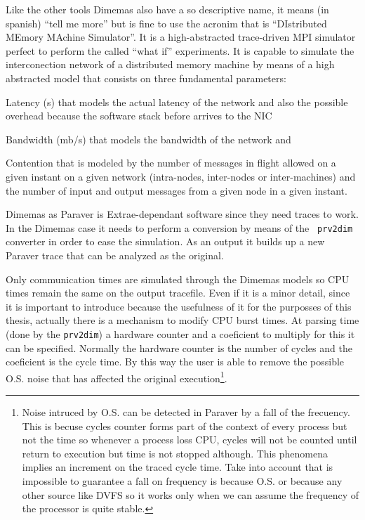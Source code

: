 Like the other tools Dimemas also have a so descriptive name, it means (in
spanish) ``tell me more'' but is fine to use the acronim that is ``DIstributed
MEmory MAchine Simulator''. It is a high-abstracted trace-driven MPI simulator
perfect to perform the called ``what if'' experiments. It is capable to simulate
the interconection network of a distributed memory machine by means of a high
abstracted model that consists on three fundamental parameters:
\begin{enumerate*}[label=(\roman*)]
  \item Latency (s) that models the actual latency of the network and also the
    possible overhead because the software stack before arrives to the NIC
  \item Bandwidth (mb/s) that models the bandwidth of the network and
  \item Contention that is modeled by the number of messages in flight 
    allowed on a given instant on a given network (intra-nodes, inter-nodes or
    inter-machines) and the number of input and output messages from a given
    node in a given instant.
\end{enumerate*}

Dimemas as Paraver is Extrae-dependant software since they need traces to work.
In the Dimemas case it needs to perform a conversion by means of the {\tt
prv2dim} converter in order to ease the simulation. As an output it builds up a
new Paraver trace that can be analyzed as the original.

Only communication times are simulated through the Dimemas models so CPU times
remain the same on the output tracefile. Even if it is a minor detail, since it
is important to introduce because the usefulness of it for the purposses of this
thesis, actually there is a mechanism to modify CPU burst times. At parsing time
(done by the {\tt prv2dim}) a hardware counter and a coeficient to multiply 
for this it can be specified. Normally the hardware counter is the number of 
cycles and the coeficient is the cycle time. By this way the user is able to 
remove the possible O.S. noise that has affected the original
execution\footnote{Noise intruced by O.S. can be detected in Paraver by a fall 
  of the frecuency. This is becuse cycles counter forms part of the context of
  every process but not the time so whenever a process loss CPU, cycles will not
  be counted until return to execution but time is not stopped although. This
  phenomena implies an increment on the traced cycle time. Take into account
  that is impossible to guarantee a fall on frequency is because O.S. or because
  any other source like DVFS so it works only when we can assume the frequency
of the processor is quite stable.}.

